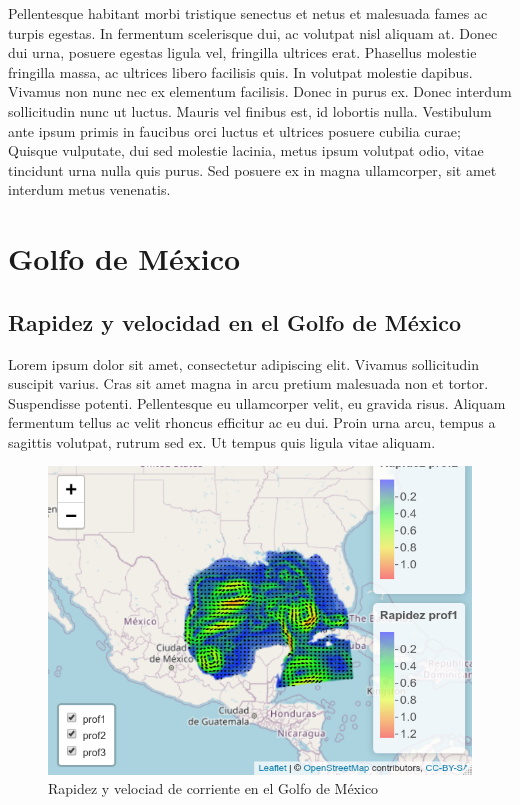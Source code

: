 \documentclass[
]{article}
\begin{document}
Pellentesque habitant morbi tristique senectus et netus et malesuada fames ac turpis egestas. In fermentum scelerisque dui, ac volutpat nisl aliquam at. Donec dui urna, posuere egestas ligula vel, fringilla ultrices erat. Phasellus molestie fringilla massa, ac ultrices libero facilisis quis. In volutpat molestie dapibus. Vivamus non nunc nec ex elementum facilisis. Donec in purus ex. Donec interdum sollicitudin nunc ut luctus. Mauris vel finibus est, id lobortis nulla. Vestibulum ante ipsum primis in faucibus orci luctus et ultrices posuere cubilia curae; Quisque vulputate, dui sed molestie lacinia, metus ipsum volutpat odio, vitae tincidunt urna nulla quis purus. Sed posuere ex in magna ullamcorper, sit amet interdum metus venenatis.

\hypertarget{golfo-de-muxe9xico}{%
\section{Golfo de México}\label{golfo-de-muxe9xico}}

\hypertarget{rapidez-y-velocidad-en-el-golfo-de-muxe9xico}{%
\subsection{Rapidez y velocidad en el Golfo de México}\label{rapidez-y-velocidad-en-el-golfo-de-muxe9xico}}

Lorem ipsum dolor sit amet, consectetur adipiscing elit. Vivamus sollicitudin suscipit varius. Cras sit amet magna in arcu pretium malesuada non et tortor. Suspendisse potenti. Pellentesque eu ullamcorper velit, eu gravida risus. Aliquam fermentum tellus ac velit rhoncus efficitur ac eu dui. Proin urna arcu, tempus a sagittis volutpat, rutrum sed ex. Ut tempus quis ligula vitae aliquam.

\begin{figure}
\includegraphics[width=0.95\linewidth]{images/golfomex01} \caption{Rapidez y velociad de corriente en el Golfo de México}\label{fig:Mapa03}
\end{figure}
\end{document}
